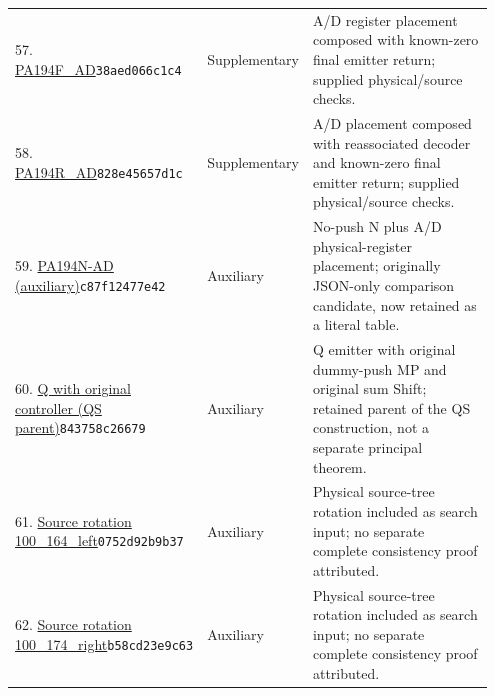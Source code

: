 \begin{longtable}{@{}p{0.27\linewidth}p{0.13\linewidth}p{0.55\linewidth}@{}}
57. \href{https://github.com/VladimirReshetnikov/ProveIt/blob/32d0d8b7d93a63ad4106c18cdb29b37927acdad2/Computability/BusyBeaver/Research/PA/docs/pa_sub194_research_2026-11-13/research/reduction/companions/PA194F_AD/machine.native.tm}{PA194F\_\allowbreak{}AD}\newline\texttt{38aed066c1c4} & Supplementary & A/D register placement composed with known-zero final emitter return; supplied physical/source checks.\\[5pt]
58. \href{https://github.com/VladimirReshetnikov/ProveIt/blob/32d0d8b7d93a63ad4106c18cdb29b37927acdad2/Computability/BusyBeaver/Research/PA/docs/pa_sub194_research_2026-11-13/research/reduction/companions/PA194R_AD/machine.native.tm}{PA194R\_\allowbreak{}AD}\newline\texttt{828e45657d1c} & Supplementary & A/D placement composed with reassociated decoder and known-zero final emitter return; supplied physical/source checks.\\[5pt]
59. \href{https://github.com/VladimirReshetnikov/ProveIt/blob/32d0d8b7d93a63ad4106c18cdb29b37927acdad2/Computability/BusyBeaver/Research/PA/docs/pa194_qradix_research_2026-11-13/comparison/frontier_tables/238d0b6a46e04c8a.tm}{PA194N-AD (auxiliary)}\newline\texttt{c87f12477e42} & Auxiliary & No-push N plus A/D physical-register placement; originally JSON-only comparison candidate, now retained as a literal table.\\[5pt]
60. \href{https://github.com/VladimirReshetnikov/ProveIt/blob/32d0d8b7d93a63ad4106c18cdb29b37927acdad2/Computability/BusyBeaver/Research/PA/docs/pa194qns_research_2026-11-13/machines/PA194QS/parent.native.tm}{Q with original controller (QS parent)}\newline\texttt{843758c26679} & Auxiliary & Q emitter with original dummy-push MP and original sum Shift; retained parent of the QS construction, not a separate principal theorem.\\[5pt]
61. \href{https://github.com/VladimirReshetnikov/ProveIt/blob/32d0d8b7d93a63ad4106c18cdb29b37927acdad2/Computability/BusyBeaver/Research/PA/docs/pa_consistency_research_2026-11-14_2/research/physical/inputs/rotations/100_164_left.tm}{Source rotation 100\_\allowbreak{}164\_\allowbreak{}left}\newline\texttt{0752d92b9b37} & Auxiliary & Physical source-tree rotation included as search input; no separate complete consistency proof attributed.\\[5pt]
62. \href{https://github.com/VladimirReshetnikov/ProveIt/blob/32d0d8b7d93a63ad4106c18cdb29b37927acdad2/Computability/BusyBeaver/Research/PA/docs/pa_consistency_research_2026-11-14_2/research/physical/inputs/source_programs/100_174_right/machine.native.tm}{Source rotation 100\_\allowbreak{}174\_\allowbreak{}right}\newline\texttt{b58cd23e9c63} & Auxiliary & Physical source-tree rotation included as search input; no separate complete consistency proof attributed.\\[5pt]

\end{longtable}
